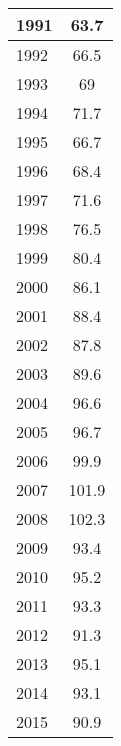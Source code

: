 \documentclass{mcmthesis}
\begin{document}
\begin{appendices}
\begin{minipage}{\textwidth}
\begin{minipage}[t]{0.45\textwidth}
\begin{tabular}{|l|c|}
          1991 & 63.7                       \\ \hline
          1992 & 66.5                       \\ \hline
          1993 & 69                         \\ \hline
          1994 & 71.7                       \\ \hline
          1995 & 66.7                       \\ \hline
          1996 & 68.4                       \\ \hline
          1997 & 71.6                       \\ \hline
          1998 & 76.5                       \\ \hline
          1999 & 80.4                       \\ \hline
          2000 & 86.1                       \\ \hline
          2001 & 88.4                       \\ \hline
          2002 & 87.8                       \\ \hline
          2003 & 89.6                       \\ \hline
          2004 & 96.6                       \\ \hline
          2005 & 96.7                       \\ \hline
          2006 & 99.9                       \\ \hline
          2007 & 101.9                      \\ \hline
          2008 & 102.3                      \\ \hline
          2009 & 93.4                       \\ \hline
          2010 & 95.2                       \\ \hline
          2011 & 93.3                       \\ \hline
          2012 & 91.3                       \\ \hline
          2013 & 95.1                       \\ \hline
          2014 & 93.1                       \\ \hline
          2015 & 90.9                       \\ \hline
          \end{tabular}
    \end{minipage}
 \end{minipage}

\end{appendices}
\end{document}
